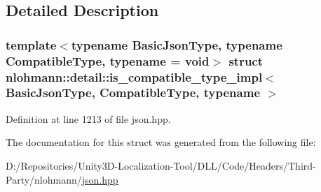 \subsection{Detailed Description}
\subsubsection*{template$<$typename Basic\+Json\+Type, typename Compatible\+Type, typename = void$>$\newline
struct nlohmann\+::detail\+::is\+\_\+compatible\+\_\+type\+\_\+impl$<$ Basic\+Json\+Type, Compatible\+Type, typename $>$}



Definition at line 1213 of file json.\+hpp.



The documentation for this struct was generated from the following file\+:\begin{DoxyCompactItemize}
\item 
D\+:/\+Repositories/\+Unity3\+D-\/\+Localization-\/\+Tool/\+D\+L\+L/\+Code/\+Headers/\+Third-\/\+Party/nlohmann/\mbox{\hyperlink{json_8hpp}{json.\+hpp}}\end{DoxyCompactItemize}
